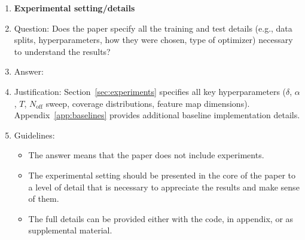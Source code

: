 \documentclass{article}
\begin{document}
\begin{enumerate}
\item {\bf Experimental setting/details}
    \item[] Question: Does the paper specify all the training and test details (e.g., data splits, hyperparameters, how they were chosen, type of optimizer) necessary to understand the results?
    \item[] Answer: \answerYes{}
    \item[] Justification: Section~\ref{sec:experiments} specifies all key hyperparameters ($\delta$, $\alpha$, $T$, $N_{\mathrm{off}}$ sweep, coverage distributions, feature map dimensions). Appendix~\ref{app:baselines} provides additional baseline implementation details.
    \item[] Guidelines:
    \begin{itemize}
        \item The answer \answerNA{} means that the paper does not include experiments.
        \item The experimental setting should be presented in the core of the paper to a level of detail that is necessary to appreciate the results and make sense of them.
        \item The full details can be provided either with the code, in appendix, or as supplemental material.
    \end{itemize}


\end{enumerate}
\end{document}
